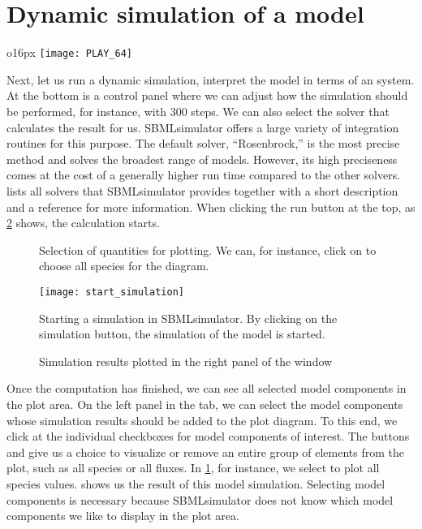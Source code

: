 \section{Dynamic simulation of a model}
\begin{wrapfigure}{o}{16px}
\vspace{\wrapfigspace}
\texttt{[image: PLAY\_64]}
\end{wrapfigure}
Next, let us run a dynamic simulation, \ie interpret the model in terms of an \ODE system.
At the bottom is a control panel where we can adjust how the simulation should be performed, for instance, with 300 steps.
We can also select the solver that calculates the result for us.
SBMLsimulator offers a large variety of integration routines for this purpose.
The default solver, ``Rosenbrock,'' is the most precise method and solves the broadest range of models.
However, its high preciseness comes at the cost of a generally higher run time compared to the other solvers.
 lists all solvers that SBMLsimulator provides together with a short description and a reference for more information.
When clicking the run button at the top, as \cref{fig:startSimulation} shows, the calculation starts.
\begin{figure}[t]
\centering
{}
\caption[Selection of quantities for plotting]{Selection of quantities for plotting.
We can, for instance, click on  to choose all species for the diagram.}
\label{fig:selectSpecies}
\end{figure}
\begin{figure}[t]
\centering
\texttt{[image: start\_simulation]}
\caption[Starting a simulation in SBMLsimulator]{Starting a simulation in SBMLsimulator.
By clicking on the simulation button, the simulation of the model is started.}
\label{fig:startSimulation}
\end{figure}
\begin{figure}[t]
\centering
{}
\caption[Simulation results plotted in the right panel of the window]{Simulation results plotted in the right panel of the window}
\label{fig:simulationResults}
\end{figure}

Once the computation has finished, we can see all selected model components in the plot area.
On the left panel in the  tab, we can select the model components whose simulation results should be added to the plot diagram.
To this end, we click at the individual checkboxes for model components of interest.
The buttons  and  give us a choice to visualize or remove an entire group of elements from the plot, such as all species or all fluxes.
In \cref{fig:selectSpecies}, for instance, we select to plot all species values.
 shows us the result of this model simulation.
Selecting model components is necessary because SBMLsimulator does not know which model components we like to display in the plot area.

